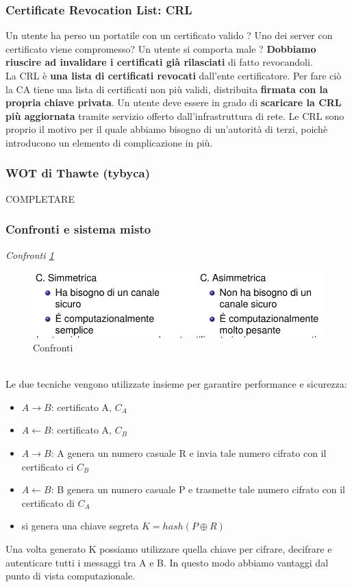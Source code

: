 \documentclass[12pt]{article}
\begin{document}
			\subsubsection{Certificate Revocation List: CRL}
				Un utente ha perso un portatile con un certificato valido ? Uno dei server con certificato viene compromesso? Un utente si comporta male ? \textbf{Dobbiamo riuscire ad invalidare i certificati già rilasciati} di fatto revocandoli.\\
				La CRL è \textbf{una lista di certificati revocati} dall'ente certificatore. Per fare ciò la CA tiene una lista di certificati non più validi, distribuita \textbf{firmata con la propria chiave privata}. Un utente deve essere in grado di \textbf{scaricare la CRL più aggiornata} tramite servizio offerto dall'infrastruttura di rete. Le CRL sono proprio il motivo per il quale abbiamo bisogno di un'autorità di terzi, poichè introducono un elemento di complicazione in più.
			\subsubsection{WOT di Thawte (tybyca)}
			 	COMPLETARE
			\subsubsection{Confronti e sistema misto}
				 
				 \textit{Confronti \ref{fig:18}}\\
				 \begin{figure}[h!]
				 	\centering
				 	\includegraphics[scale=0.60]{img/confronto.PNG}
				 	\caption{Confronti \label{fig:18}}
				 \end{figure}\\
				 
				 
				 Le due tecniche vengono utilizzate insieme per garantire performance e sicurezza:
				 \begin{itemize}
				 	\item $A \rightarrow B$: certificato A, $C_{A}$
				 	\item $A \leftarrow B$: certificato A, $C_{B}$
				 	\item $A \rightarrow B$: A genera un numero casuale R e invia tale numero cifrato con il certificato ci $C_{B}$
				 	\item $A \leftarrow B$: B genera un numero casuale P  e trasmette tale numero cifrato con il certificato di $C_{A}$
				 	\item si genera una chiave segreta  $K = hash(P\oplus R) $
				 \end{itemize}
			 	Una volta generato K possiamo utilizzare quella chiave per cifrare, decifrare e autenticare tutti i messaggi tra A e B. In questo modo abbiamo vantaggi dal punto di vista computazionale.
\end{document}
